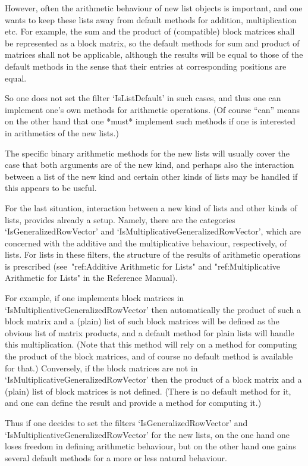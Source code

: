 However, often the arithmetic behaviour of new list objects is important,
and one wants to keep these lists away from default methods for addition,
multiplication etc.
For example, the sum and the product of (compatible) block matrices shall
be represented as a block matrix, so the default methods for sum and
product of matrices shall not be applicable,
although the results will be equal to those of the default methods
in the sense that their entries at corresponding positions are equal.

So one does not set the filter `IsListDefault' in such cases,
and thus one can implement one's own methods for arithmetic operations.
(Of course ``can'' means on the other hand that one *must* implement such
methods if one is interested in arithmetics of the new lists.)

The specific binary arithmetic methods for the new lists will usually cover
the case that both arguments are of the new kind,
and perhaps also the interaction between a list of the new kind and certain
other kinds of lists may be handled if this appears to be useful.

For the last situation, interaction between a new kind of lists and other
kinds of lists, {\GAP} provides already a setup.
Namely, there are the categories `IsGeneralizedRowVector' and
`IsMultiplicativeGeneralizedRowVector', which are concerned with the
additive and the multiplicative behaviour, respectively, of lists. 
For lists in these filters, the structure of the results of arithmetic
operations is prescribed (see~"ref:Additive Arithmetic for Lists" and
"ref:Multiplicative Arithmetic for Lists" in the {\GAP} Reference Manual).

For example,
if one implements block matrices in `IsMultiplicativeGeneralizedRowVector'
then automatically the product of such a block matrix and a (plain) list
of such block matrices will be defined as the obvious list of matrix
products, and a default method for plain lists will handle this
multiplication.
(Note that this method will rely on a method for computing the product of
the block matrices, and of course no default method is available for that.)
Conversely, if the block matrices are not in
`IsMultiplicativeGeneralizedRowVector' then the product of a block matrix
and a (plain) list of block matrices is not defined.
(There is no default method for it, and one can define the result and
provide a method for computing it.)

Thus if one decides to set the filters `IsGeneralizedRowVector' and
`IsMultiplicativeGeneralizedRowVector' for the new lists,
on the one hand one loses freedom in defining arithmetic behaviour,
but on the other hand one gains several default methods for a more
or less natural behaviour.

